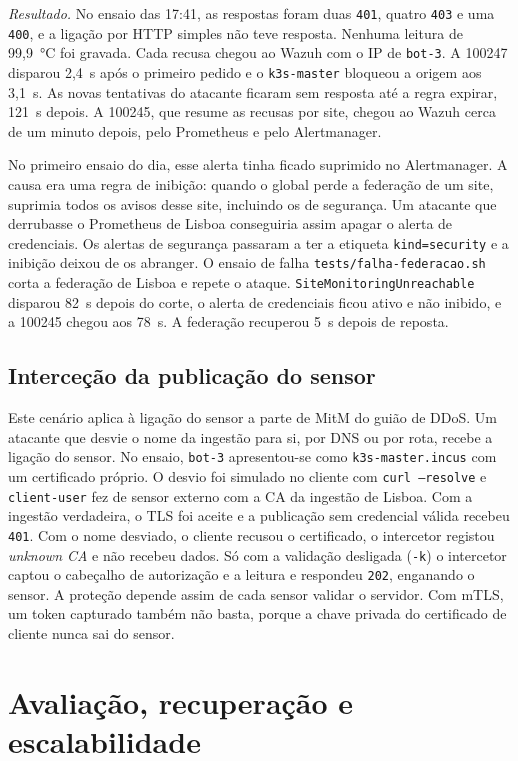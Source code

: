 \documentclass[conference,a4paper]{IEEEtran}
\newcommand{\code}[1]{\texttt{\small #1}}
\begin{document}
\emph{Resultado.} No ensaio das 17:41, as respostas foram duas \code{401}, quatro \code{403} e uma \code{400}, e a ligação por HTTP simples não teve resposta. Nenhuma leitura de 99,9~°C foi gravada. Cada recusa chegou ao Wazuh com o IP de \code{bot-3}. A 100247 disparou 2,4~s após o primeiro pedido e o \code{k3s-master} bloqueou a origem aos 3,1~s. As novas tentativas do atacante ficaram sem resposta até a regra expirar, 121~s depois. A 100245, que resume as recusas por site, chegou ao Wazuh cerca de um minuto depois, pelo Prometheus e pelo Alertmanager.

No primeiro ensaio do dia, esse alerta tinha ficado suprimido no Alertmanager. A causa era uma regra de inibição: quando o global perde a federação de um site, suprimia todos os avisos desse site, incluindo os de segurança. Um atacante que derrubasse o Prometheus de Lisboa conseguiria assim apagar o alerta de credenciais. Os alertas de segurança passaram a ter a etiqueta \code{kind=security} e a inibição deixou de os abranger. O ensaio de falha \code{tests/falha-federacao.sh} corta a federação de Lisboa e repete o ataque. \code{SiteMonitoringUnreachable} disparou 82~s depois do corte, o alerta de credenciais ficou ativo e não inibido, e a 100245 chegou aos 78~s. A federação recuperou 5~s depois de reposta.

\subsection{Interceção da publicação do sensor}
Este cenário aplica à ligação do sensor a parte de MitM do guião de DDoS. Um atacante que desvie o nome da ingestão para si, por DNS ou por rota, recebe a ligação do sensor. No ensaio, \code{bot-3} apresentou-se como \code{k3s-master.incus} com um certificado próprio. O desvio foi simulado no cliente com \code{curl --resolve} e \code{client-user} fez de sensor externo com a CA da ingestão de Lisboa. Com a ingestão verdadeira, o TLS foi aceite e a publicação sem credencial válida recebeu \code{401}. Com o nome desviado, o cliente recusou o certificado, o intercetor registou \emph{unknown CA} e não recebeu dados. Só com a validação desligada (\code{-k}) o intercetor captou o cabeçalho de autorização e a leitura e respondeu \code{202}, enganando o sensor. A proteção depende assim de cada sensor validar o servidor. Com mTLS, um token capturado também não basta, porque a chave privada do certificado de cliente nunca sai do sensor.

\section{Avaliação, recuperação e escalabilidade}
\end{document}
